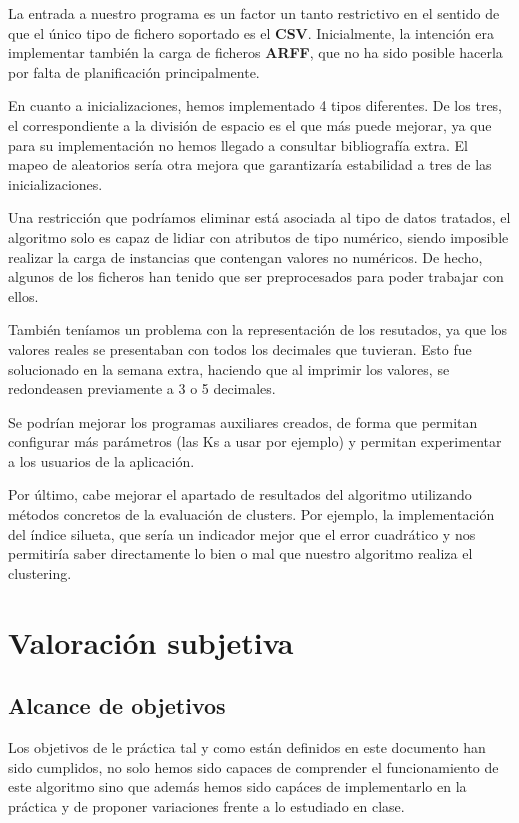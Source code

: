 \documentclass[a4paper]{report}
\begin{document}
La entrada a nuestro programa es un factor un tanto restrictivo en el sentido de que el único tipo de fichero soportado es el \textbf{CSV}. Inicialmente, la intención era implementar también la carga de ficheros \textbf{ARFF}, que no ha sido posible hacerla por falta de planificación principalmente.

En cuanto a inicializaciones, hemos implementado 4 tipos diferentes. De los tres, el correspondiente a la división de espacio es el que más puede mejorar, ya que para su implementación no hemos llegado a consultar bibliografía extra. El mapeo de aleatorios sería otra mejora que garantizaría estabilidad a tres de las inicializaciones.

Una restricción que podríamos eliminar está asociada al tipo de datos tratados, el algoritmo solo es capaz de lidiar con atributos de tipo numérico, siendo imposible realizar la carga de instancias que contengan valores no numéricos. De hecho, algunos de los ficheros han tenido que ser preprocesados para poder trabajar con ellos.

También teníamos un problema con la representación de los resutados, ya que los valores reales se presentaban con todos los decimales que tuvieran. Esto fue solucionado en la semana extra, haciendo que al imprimir los valores, se redondeasen previamente a 3 o 5 decimales.

Se podrían mejorar los programas auxiliares creados, de forma que permitan configurar más parámetros (las Ks a usar por ejemplo) y permitan experimentar a los usuarios de la aplicación.

Por último, cabe mejorar el apartado de resultados del algoritmo utilizando métodos concretos de la evaluación de clusters. Por ejemplo, la implementación del índice silueta, que sería un indicador mejor que el error cuadrático y nos permitiría saber directamente lo bien o mal que nuestro algoritmo realiza el clustering.




\newpage




\newpage


\chapter{Valoración subjetiva}
	
	\section*{Alcance de objetivos}
	Los objetivos de le práctica tal y como están definidos en este documento han sido cumplidos, no solo hemos sido capaces de comprender el funcionamiento de este algoritmo sino que además hemos sido capáces de implementarlo en la práctica y de proponer variaciones frente a lo estudiado en clase.
\end{document}
